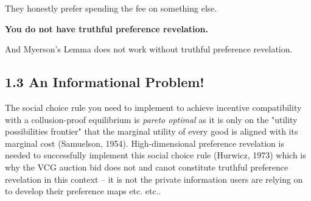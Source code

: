 \documentclass[oneside]{article}   	%
\begin{document}
They honestly prefer spending the fee on something else.

\textbf{You do not have truthful preference revelation.}

And Myerson's Lemma does not work without truthful preference revelation.


\subsection*{1.3 An Informational Problem!}

The social choice rule you need to implement to achieve incentive compatibility with a collusion-proof equilibrium is \textit{pareto optimal} as it is only on the "utility possibilities frontier" that the marginal utility of every good is aligned with its marginal cost (Samuelson, 1954). High-dimensional preference revelation is needed to successfully implement this social choice rule (Hurwicz, 1973) which is why the VCG auction bid does not and canot constitute truthful preference revelation in this context -- it is not the private information users are relying on to develop their preference maps etc. etc..

\pagebreak
\end{document}
